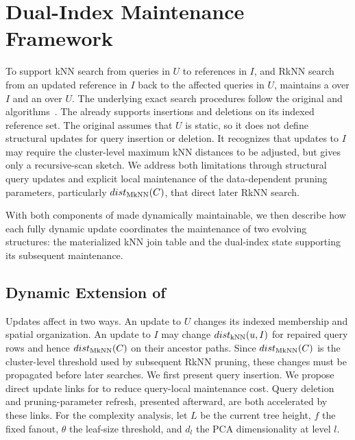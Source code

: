 \section{Dual-Index Maintenance Framework}
\label{sec:framework}

To support kNN search from queries in $U$ to references in $I$, and RkNN search from an updated reference in $I$ back to the affected queries in $U$, \dualtree maintains a \deltatree over $I$ and an \hdrtree over $U$. The underlying exact search procedures follow the original \deltatree and \hdrtree algorithms~\cite{cui2003contorting,yang2014continuous}. The \deltatree already supports insertions and deletions on its indexed reference set. The original \hdrtree assumes that $U$ is static, so it does not define structural updates for query insertion or deletion. It recognizes that updates to $I$ may require the cluster-level maximum kNN distances to be adjusted, but gives only a recursive-scan sketch. We address both limitations through structural query updates and explicit local maintenance of the data-dependent pruning parameters, particularly $dist_{\operatorname{MkNN}}(C)$, that direct later RkNN search.

With both components of \dualtree made dynamically maintainable, we then describe how each fully dynamic update coordinates the maintenance of two evolving structures: the materialized kNN join table and the dual-index state supporting its subsequent maintenance.

\subsection{Dynamic Extension of \hdrtree}
\label{subsec:dynamic-hdr}

Updates affect \hdrtree in two ways. An update to $U$ changes its indexed membership and spatial organization. An update to $I$ may change $dist_{\operatorname{kNN}}(u,I)$ for repaired query rows and hence $dist_{\operatorname{MkNN}}(C)$ on their ancestor paths. Since $dist_{\operatorname{MkNN}}(C)$ is the cluster-level threshold used by subsequent RkNN pruning, these changes must be propagated before later searches. We first present query insertion. We propose direct update links for \hdrtree to reduce query-local maintenance cost. Query deletion and pruning-parameter refresh, presented afterward, are both accelerated by these links. For the complexity analysis, let $L$ be the current tree height, $f$ the fixed fanout, $\theta$ the leaf-size threshold, and $d_l$ the PCA dimensionality at level $l$.

